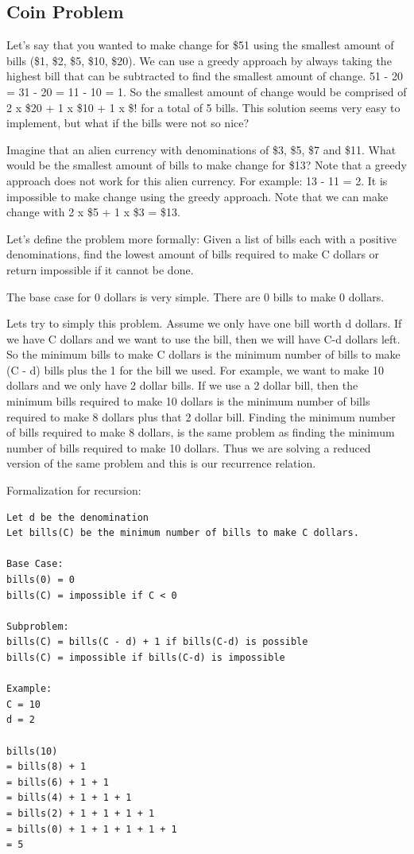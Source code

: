 \documentclass[11pt,oneside]{book}
\begin{document}
\subsection{Coin Problem}

Let's say that you wanted to make change for \$51 using the smallest amount of bills (\$1, \$2, \$5, \$10, \$20). We can use a greedy approach by always taking the highest bill that can be subtracted to find the smallest amount of change. 51 - 20 = 31 - 20 = 11 - 10 = 1. So the smallest amount of change would be comprised of 2 x \$20 + 1 x \$10 + 1 x \$! for a total of 5 bills. This solution seems very easy to implement, but what if the bills were not so nice?

Imagine that an alien currency with denominations of \$3, \$5, \$7 and \$11. What would be the smallest amount of bills to make change for \$13? Note that a greedy approach does not work for this alien currency. For example: 13 - 11 = 2. It is impossible to make change using the greedy approach. Note that we can make change with 2 x \$5 + 1 x \$3 = \$13.

Let's define the problem more formally: Given a list of bills each with a positive denominations, find the lowest amount of bills required to make C dollars or return impossible if it cannot be done.

The base case for 0 dollars is very simple. There are 0 bills to make 0 dollars.

Lets try to simply this problem. Assume we only have one bill worth d dollars. If we have C dollars and we want to use the bill, then we will have C-d dollars left. So the minimum bills to make C dollars is the minimum number of bills to make (C - d) bills plus the 1 for the bill we used. For example, we want to make 10 dollars and we only have 2 dollar bills. If we use a 2 dollar bill, then the minimum bills required to make 10 dollars is the minimum number of bills required to make 8 dollars plus that 2 dollar bill. Finding the minimum number of bills required to make 8 dollars, is the same problem as finding the minimum number of bills required to make 10 dollars. Thus we are solving a reduced version of the same problem and this is our recurrence relation.

Formalization for recursion:

\begin{lstlisting}
Let d be the denomination
Let bills(C) be the minimum number of bills to make C dollars.

Base Case:
bills(0) = 0
bills(C) = impossible if C < 0

Subproblem:
bills(C) = bills(C - d) + 1 if bills(C-d) is possible
bills(C) = impossible if bills(C-d) is impossible

Example:
C = 10
d = 2

bills(10) 
= bills(8) + 1
= bills(6) + 1 + 1
= bills(4) + 1 + 1 + 1
= bills(2) + 1 + 1 + 1 + 1
= bills(0) + 1 + 1 + 1 + 1 + 1
= 5
\end{lstlisting}
\end{document}
